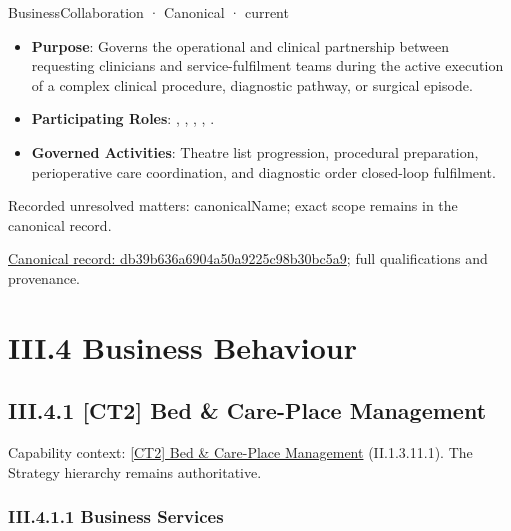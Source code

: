 \label{element:db39b636a6904a50a9225c98b30bc5a9}
{\small BusinessCollaboration · Canonical · current}\par

\begin{itemize}


\item \textbf{Purpose}: Governs the operational and clinical partnership between requesting clinicians and service-fulfilment teams during the active execution of a complex clinical procedure, diagnostic pathway, or surgical episode.

\item \textbf{Participating Roles}: \texttt{}, \texttt{}, \texttt{}, \texttt{}, \texttt{}.

\item \textbf{Governed Activities}: Theatre list progression, procedural preparation, perioperative care coordination, and diagnostic order closed-loop fulfilment.

\end{itemize}

{\small Recorded unresolved matters: canonicalName; exact scope remains in the canonical record.}\par
{\footnotesize \href{../../../../continuum/business/business-collaboration/db39b636a6904a50a9225c98b30bc5a9.md}{Canonical record: db39b636a6904a50a9225c98b30bc5a9}; full qualifications and provenance.}\par
\chapter*{III.4 Business Behaviour}
\label{navigation:III.4}

\section*{III.4.1 [CT2] Bed \& Care-Place Management}
\label{navigation:III.4.1}

{\small Capability context: \hyperref[element:f117ccec0bfa4f738e6ddb646b3534a2]{[CT2] Bed \& Care-Place Management} (II.1.3.11.1). The Strategy hierarchy remains authoritative.}\par
\subsection*{III.4.1.1 Business Services}
\label{navigation:III.4.1.1}

